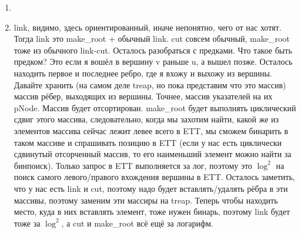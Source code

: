 \documentclass[12pt]{article}
\begin{document}
\begin{enumerate}
	\setlength{\parskip}{0pt} 
	\setlength{\itemsep}{0pt} 
	\item ~\\
    \item link, видимо, здесь ориентированный, иначе непонятно, чего от нас хотят. Тогда link это make\_root + обычный link. cut совсем обычный, make\_root тоже 
    из обычного link-cut. Осталось разобраться с предками. Что такое быть предком? Это если я вошёл в вершину v раньше u, а вышел позже. Осталось находить первое и последнее ребро, 
    где я вхожу и выхожу из вершины. Давайте хранить (на самом деле treap, но пока представим что это массив) массив рёбер, выходящих из вершины. Точнее, массив указателей на их 
    pNode. Массив будет отсортирован. make\_root будет выполнять циклический сдвиг этого массива, следовательно, когда мы захотим найти, какой же из элементов массива сейчас 
    лежит левее всего в ETT, мы сможем бинарить в таком массиве и спрашивать позицию в ETT (если у нас есть циклически сдвинутый отсорченный массив, то его наименьший элемент можно найти 
    за бинпоиск). Только запрос в ETT выполняется за лог, поэтому это $\log^2$ на поиск самого левого/правого вхождения вершины в ETT. Осталось заметить, что у нас есть link и 
    cut, поэтому надо будет вставлять/удалять рёбра в эти массивы, поэтому заменим эти массиры на treap. Теперь чтобы находить место, куда в них вставлять элемент, тоже нужен бинарь, поэтому 
    link будет тоже за $\log^2$, а cut и make\_root всё ещё за логарифм. \\
\end{enumerate}
\end{document}

